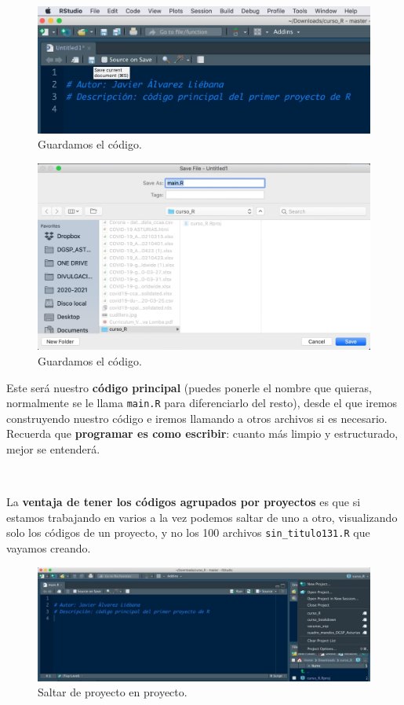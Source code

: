 \documentclass[11pt,]{book}
\begin{document}
\begin{figure}

{\centering \includegraphics[width=0.5\linewidth]{./img/crear_proyecto7} 

}

\caption{Guardamos el código.}\label{fig:crear-proyecto7}
\end{figure}

\begin{figure}

{\centering \includegraphics[width=0.5\linewidth]{./img/crear_proyecto8} 

}

\caption{Guardamos el código.}\label{fig:crear-proyecto8}
\end{figure}

Este será nuestro \textbf{código principal} (puedes ponerle el nombre que quieras, normalmente se le llama \texttt{main.R} para diferenciarlo del resto), desde el que iremos construyendo nuestro código e iremos llamando a otros archivos si es necesario. Recuerda que \textbf{programar es como escribir}: cuanto más limpio y estructurado, mejor se entenderá.

~

La \textbf{ventaja de tener los códigos agrupados por proyectos} es que si estamos trabajando en varios a la vez podemos saltar de uno a otro, visualizando solo los códigos de un proyecto, y no los 100 archivos \texttt{sin\_titulo131.R} que vayamos creando.

\begin{figure}

{\centering \includegraphics[width=0.5\linewidth]{./img/crear_proyecto9} 

}

\caption{Saltar de proyecto en proyecto.}\label{fig:crear-proyecto9}
\end{figure}
\end{document}
